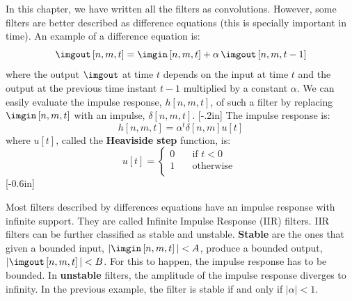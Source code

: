 In this chapter, we have written all the filters as convolutions. However, some filters are better described as difference equations (this is specially important in time). An example of a difference equation is:
\begin{equation}
\imgout \left[n,m,t \right] = \imgin \left[n,m,t \right] + \alpha \, \imgout \left[n,m,t-1 \right]
\end{equation}
where the output $\imgout$ at time $t$ depends on the input at time $t$ and the output at the previous time instant $t-1$ multiplied by a constant $\alpha$. We can easily evaluate the impulse response, $h \left[n,m,t \right]$, of such a filter by replacing $\imgin \left[n,m,t \right]$ with an impulse, $\delta \left[n,m,t \right]$. 
[-.2in]
The impulse response is:
\begin{equation}
h \left[n,m,t \right] = \alpha^t  \delta \left[n,m \right] u \left[t \right]
\end{equation}
where $u\left[t \right]$, called the {\bf Heaviside step} function, is:
\begin{equation}
u \left[t \right] = \begin{cases}
    0     & \quad \text{if }  t <0 \\
    1     & \quad \text{otherwise }\\
\end{cases}
\end{equation}
[-0.6in]

Most filters described by differences equations have an impulse response with infinite support. They are called Infinite Impulse Response (IIR) filters.
IIR filters can be further classified as stable and unstable. {\bf Stable} are the ones that given a bounded input, $| \imgin \left[n,m,t \right] |<A$, produce a bounded output, $| \imgout \left[n,m,t \right] | <B$. For this to happen, the impulse response has to be bounded. In {\bf unstable} filters, the amplitude of the impulse response diverges to infinity. In the previous example, the filter is stable if and only if $| \alpha | < 1$. 


